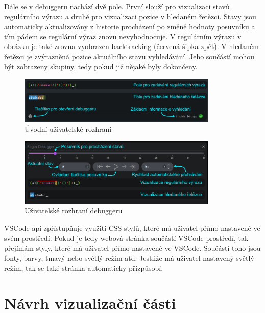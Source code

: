 Dále se v debuggeru nachází dvě pole. 
První slouží pro vizualizaci stavů regulárního výrazu a druhé pro vizualizaci pozice v hledaném řetězci.
Stavy jsou automaticky aktualizovány z historie procházení po změně hodnoty posuvníku a tím pádem se regulární výraz znovu nevyhodnocuje.
V regulárním výrazu v obrázku je také zrovna vyobrazen backtracking (červená šipka zpět).
V hledaném řetězci je zvýrazněná pozice aktuálního stavu vyhledávání.
Jeho součástí mohou být zobrazeny skupiny, tedy pokud již nějaké byly dokončeny.

\begin{figure}[!h]
	\centering
	\includegraphics[width=0.85\textwidth]{Figures/appWindow.png}
	\caption{Úvodní uživatelské rozhraní}
	\label{fig:GeneralUI}
\end{figure}

\begin{figure}[!h]
	\centering
	\includegraphics[width=0.85\textwidth]{Figures/appDebugger.png}
	\caption{Uživatelské rozhraní debuggeru}
	\label{fig:DebuggerUI}
\end{figure}

VSCode api zpřístupňuje využití CSS stylů, které má uživatel přímo nastavené ve svém prostředí.
Pokud je tedy webová stránka součástí VSCode prostředí, tak přejímám styly, které má uživatel přímo nastavené ve VSCode.
Součástí toho jsou fonty, barvy, tmavý nebo světlý režim atd.
Jestliže má uživatel nastavený světlý režim, tak se také stránka automaticky přizpůsobí.

\section{Návrh vizualizační části}

